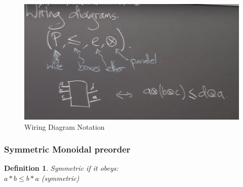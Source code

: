 \documentclass{article}
\newtheorem{defn}[thm]{Definition} %
\begin{document}
\begin{figure}[h!]
    \centering
    \includegraphics[scale=0.5]{./images/7.jpg}
    \caption{Wiring Diagram Notation}
    \label{fig:my_label}
\end{figure}

\subsubsection{Symmetric Monoidal preorder} 
\begin{defn}
    Symmetric if it obeys: \\
    $a*b \leq b*a$ (symmetric)
\end{defn}
\newpage
\end{document}
